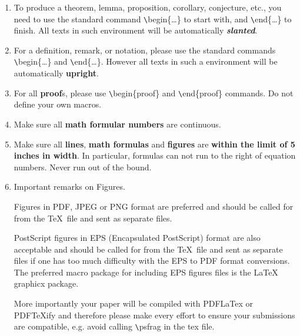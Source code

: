 \documentclass{aims}
\theoremstyle{definition}
\begin{document}
\begin{enumerate}


\item To produce a theorem, lemma, proposition, corollary,  conjecture,
etc., you need to use the standard command \verb+\+begin\{\dots\} to
start with, and \verb+\+end\{\dots\} to finish.  All texts in such
environment will be automatically \textbf{\emph{slanted}}.

\item For a definition, remark, or notation, please use the
standard commands \verb+\+begin\{\dots\} and \verb+\+end\{\dots\}.
However all texts in such a environment will be automatically
\textbf{upright}.

\item For all \textbf{proof}s, please use \verb+\+begin\{proof\} and
\verb+\+end\{proof\} commands. Do not define your own macros.

\item Make sure all \textbf{math formular numbers} are continuous.

\item Make sure all \textbf{lines}, \textbf{math formulas}
and \textbf{figures} are \textbf{\textbf{within the limit of 5
inches in width}}. In particular, formulas can not run to the right
of equation numbers. Never run out of the bound.

\item Important remarks on Figures.

Figures in PDF,  JPEG or PNG  format are preferred and should be
called for from the \TeX \, file and sent as separate files.

PostScript figures in EPS (Encapsulated PostScript) format are also
acceptable and should be called for from the \TeX \, file and sent
as separate files if one has too much difficulty with the EPS to PDF
format conversions. The preferred macro package for including EPS
figures files is the LaTeX graphicx package.

More importantly your paper will be compiled with PDFLaTex or
PDFTeXify and therefore please make every effort to ensure your
submissions are compatible, e.g. avoid calling \verb+\+psfrag in the
tex file.


\end{enumerate}
\end{document}
